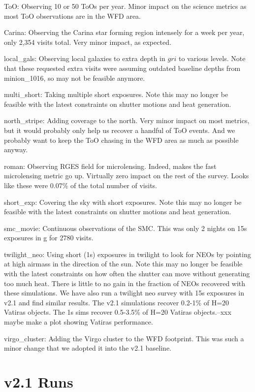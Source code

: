 ToO: Observing 10 or 50 ToOs per year. Minor impact on the science metrics as most ToO observations are in the WFD area.


Carina:  Observing the Carina star forming region intensely for a week per year, only 2,354 visits total.  Very minor impact, as expected.


local\_gals:  Observing local galaxies to extra depth in $gri$ to various levels. Note that these requested extra visits were assuming outdated baseline depths from minion\_1016, so may not be feasible anymore.

multi\_short:  Taking multiple short exposures. Note this may no longer be feasible with the latest constraints on shutter motions and heat generation.

north\_stripe:  Adding coverage to the north. Very minor impact on most metrics, but it would probably only help us recover a handful of ToO events. And we probably want to keep the ToO chasing in the WFD area as much as possible anyway.

roman: Observing RGES field for microlensing. Indeed, makes the fast microlensing metric go up. Virtually zero impact on the rest of the survey. Looks like these were 0.07\% of the total number of visits. 

short\_exp: Covering the sky with short exposures. Note this may no longer be feasible with the latest constraints on shutter motions and heat generation.

smc\_movie: Continuous observations of the SMC. This was only 2 nights on 15s exposures in g for 2780 visits. 

twilight\_neo:  Using short (1s) exposures in twilight to look for NEOs by pointing at high airmass in the direction of the sun. Note this may no longer be feasible with the latest constraints on how often the shutter can move without generating too much heat. There is little to no gain in the fraction of NEOs recovered with these simulations. We have also run a twilight neo survey with 15s exposures in v2.1 and find similar results. The v2.1 simulations recover 0.2-1\% of H=20 Vatiras objects. The 1s sims recover 0.5-3.5\% of H=20 Vatiras objects.--xxx maybe make a plot showing Vatiras performance.

virgo\_cluster:  Adding the Virgo cluster to the WFD footprint. This was such a minor change that we adopted it into the v2.1 baseline.


\section{v2.1 Runs}

